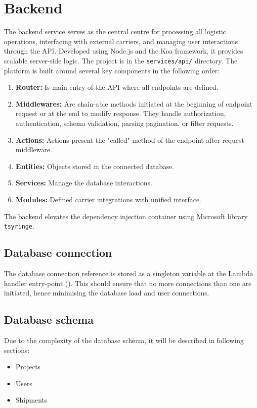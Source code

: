 \section{Backend}
\label{attachments:programming-platform.backend}
The backend service serves as the central centre for processing all logistic operations, interfacing with external carriers, and managing user interactions through the API. 
Developed using Node.js and the Koa framework, it provides scalable server-side logic.
The project is in the \texttt{services/api/} directory.
The platform is built around several key components in the following order:
\begin{enumerate}
    \item \textbf{Router:} Is main entry of the API where all endpoints are defined.
    \item \textbf{Middlewares:} Are chain-able methods initiated at the beginning of endpoint request or at the end to modify response. They handle authorization, authentication, schema validation, parsing pagination, or filter requests.
    \item \textbf{Actions:} Actions present the "called" method of the endpoint after request middleware.
    \item \textbf{Entities:} Objects stored in the connected database.
    \item \textbf{Services:} Manage the database interactions.
    \item \textbf{Modules:} Defined carrier integrations with unified interface.
\end{enumerate}

The backend elevates the dependency injection container using Microsoft library \texttt{tsyringe}.


\subsection{Database connection}
The database connection reference is stored as a singleton variable at the Lambda handler entry-point ().
This should ensure that no more connections than one are initiated, hence minimising the database load and user connections.

\subsection{Database schema}
Due to the complexity of the database schema, it will be described in following sections:
\begin{itemize}
    \item Projects
    \item Users
    \item Shipments
\end{itemize}

